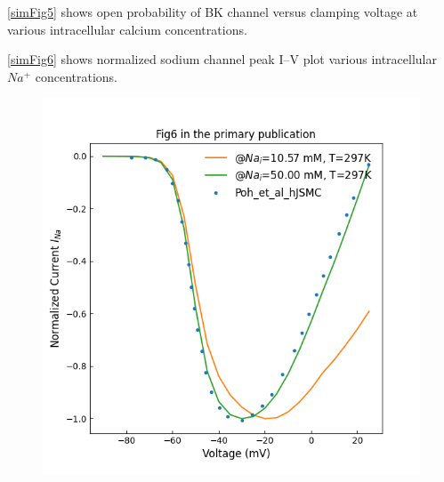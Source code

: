 \documentclass[fleqn,10pt]{physiome}
\begin{document}
\begin{figure}
\begin{minipage}{.5\textwidth}
  \label{simFig5}
\end{minipage}
\end{figure}


\autoref{simFig5} shows open probability of BK channel versus clamping voltage at various intracellular calcium concentrations.


\autoref{simFig6} shows normalized sodium channel peak I–V plot various intracellular $Na^+$ concentrations.

\begin{figure}
\centering
\begin{minipage}{.5\textwidth}
  \centering
  \includegraphics[width=\linewidth]{./figs/simFig6.png}
  \label{simFig6}
\end{minipage}%
\begin{minipage}{.5\textwidth}
  \centering

\end{minipage}
\end{figure}
\end{document}
